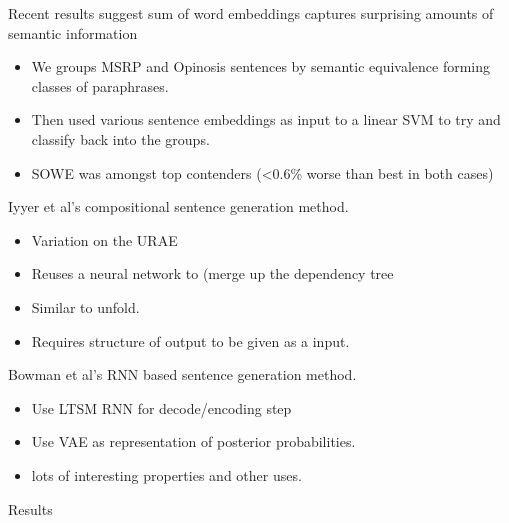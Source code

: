 \documentclass[]{beamer}
\begin{document}
\begin{frame}{Recent results suggest sum of word embeddings captures surprising amounts of semantic information}
	\begin{itemize}
		\item We groups MSRP and Opinosis sentences by semantic equivalence forming classes of paraphrases.
		\item Then used various sentence embeddings as input to a linear SVM to try and classify back into the groups.
		\item SOWE was amongst top contenders (<0.6\% worse than best in both cases)
	\end{itemize}
\end{frame}


\begin{frame}{Iyyer et al's compositional sentence generation method.}
	\begin{itemize}
		\item Variation on the URAE
		\item Reuses a neural network to (merge up the dependency tree
		\item Similar to unfold.
		\item Requires structure of output to be given as a input.
	\end{itemize}
\end{frame}


\begin{frame}{Bowman et al's RNN based sentence generation method.}
	\begin{itemize}
		\item Use LTSM RNN for decode/encoding step
		\item Use VAE as representation of posterior probabilities. 
		\item lots of interesting properties and other uses.
	\end{itemize} 
\end{frame}

\begin{frame}{Results}
	\begin{table}
	\end{table}
\end{frame}
\end{document}
